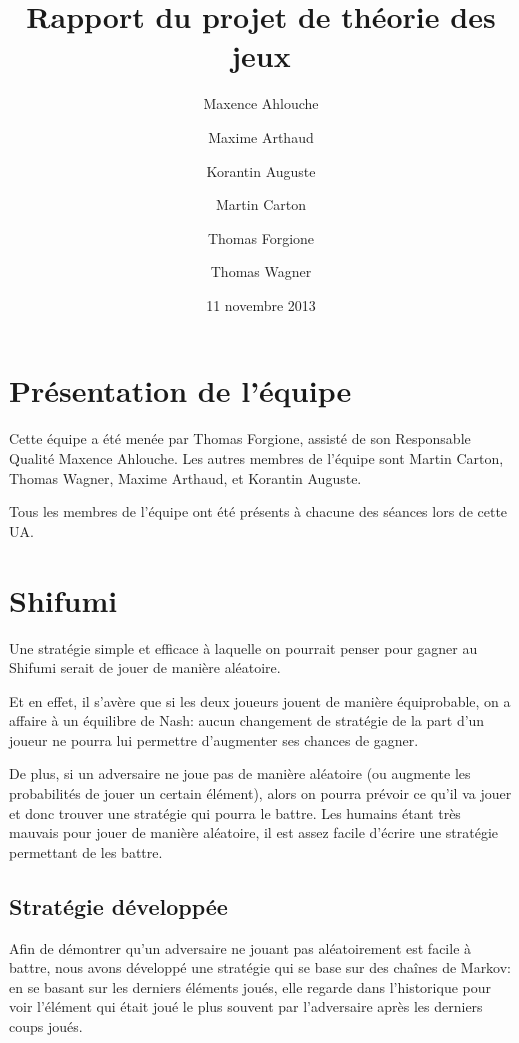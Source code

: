 \documentclass{scrartcl}
\begin{document}
\title{Rapport du projet de théorie des jeux}
\author{Maxence Ahlouche \and Maxime Arthaud \and Korantin Auguste
          \and Martin Carton \and Thomas Forgione \and Thomas Wagner}
\date{11 novembre 2013}
\maketitle
\tableofcontents
\newpage

\section{Présentation de l'équipe}
  Cette équipe a été menée par Thomas Forgione, assisté de son Responsable
  Qualité Maxence Ahlouche. Les autres membres de l'équipe sont Martin Carton,
  Thomas Wagner, Maxime Arthaud, et Korantin Auguste.

  Tous les membres de l'équipe ont été présents à chacune des séances lors de
  cette UA.

\section{Shifumi}
    Une stratégie simple et efficace à laquelle on pourrait penser pour gagner
    au Shifumi serait de jouer de manière aléatoire.

    Et en effet, il s'avère que si les deux joueurs jouent de manière équiprobable,
    on a affaire à un équilibre de Nash: aucun changement de stratégie de la part
    d'un joueur ne pourra lui permettre d'augmenter ses chances de gagner.

    De plus, si un adversaire ne joue pas de manière aléatoire (ou augmente les
    probabilités de jouer un certain élément), alors on pourra prévoir ce qu'il
    va jouer et donc trouver une stratégie qui pourra le battre. Les humains
    étant très mauvais pour jouer de manière aléatoire, il est assez facile
    d'écrire une stratégie permettant de les battre.

  \subsection{Stratégie développée}
    Afin de démontrer qu'un adversaire ne jouant pas aléatoirement est facile
    à battre, nous avons développé une stratégie qui se base sur des chaînes
    de Markov: en se basant sur les derniers éléments joués, elle regarde
    dans l'historique pour voir l'élément qui était joué le plus souvent par
    l'adversaire après les derniers coups joués.
\end{document}
